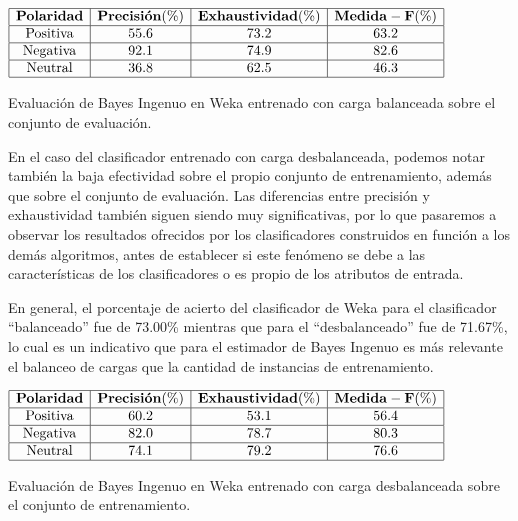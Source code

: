 
\begin{table}[htb] 
\centering

$
\begin{array}{|c|c|c|c|}
      \hline
      \mathbf{Polaridad} & \mathbf{Precisi\acute{o}n(\%)} & \mathbf{Exhaustividad(\%)} & \mathbf{Medida-F(\%)}	\\
      \hline
      \mathrm{Positiva}  & 55.6	& 73.2 & 63.2	\\
      \hline
      \mathrm{Negativa}  & 92.1 & 74.9 & 82.6	\\
      \hline
      \mathrm{Neutral}	 & 36.8 & 62.5 & 46.3	\\
      \hline
\end{array}
$
\caption{Evaluaci\'on de Bayes Ingenuo en Weka entrenado con carga balanceada sobre el conjunto de evaluaci\'on.}
\label{res:bayesweka_baleval}
\end{table}


En el caso del clasificador entrenado con carga desbalanceada, podemos notar tambi\'en la baja efectividad sobre el propio conjunto de entrenamiento, adem\'as que sobre el conjunto de evaluaci\'on. Las diferencias entre precisi\'on y exhaustividad tambi\'en siguen siendo muy significativas, por lo que pasaremos a observar los resultados ofrecidos por los clasificadores construidos en funci\'on a los dem\'as algoritmos, antes de establecer si este fen\'omeno se debe a las caracter\'isticas de los clasificadores o es propio de los atributos de entrada.
\newline

En general, el porcentaje de acierto del clasificador de Weka para el clasificador ``balanceado'' fue de 73.00\% mientras que para el ``desbalanceado'' fue de 71.67\%, lo cual es un indicativo que para el estimador de Bayes Ingenuo es m\'as relevante el balanceo de cargas que la cantidad de instancias de entrenamiento.


\begin{table}[htb] 
\centering

$
\begin{array}{|c|c|c|c|}
      \hline
      \mathbf{Polaridad} & \mathbf{Precisi\acute{o}n(\%)} & \mathbf{Exhaustividad(\%)} & \mathbf{Medida-F(\%)}	\\
      \hline
      \mathrm{Positiva}  & 60.2	& 53.1 & 56.4	\\
      \hline
      \mathrm{Negativa}  & 82.0 & 78.7 & 80.3	\\
      \hline
      \mathrm{Neutral}	 & 74.1 & 79.2 & 76.6	\\
      \hline
\end{array}
$
\caption{Evaluaci\'on de Bayes Ingenuo en Weka entrenado con carga desbalanceada sobre el conjunto de entrenamiento.}
\label{res:bayesweka_desbaltrain}
\end{table}

